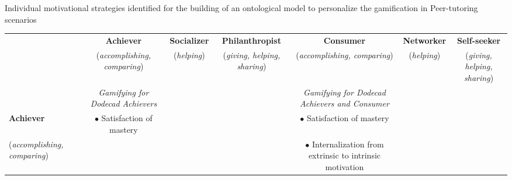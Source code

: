 \begin{landscape}%



\begin{quadro}[htb]
\caption{Individual motivational strategies identified for the building of an ontological model to personalize the gamification in Peer-tutoring scenarios}
\label{tab:individual-motivational-strategies-in-peer-tutoring-cl-scenarios}
\centering
\scriptsize
\begin{tabular}{|l|c|c|c|c|c|c|}
\hline%
\multicolumn{1}{|l|}{}&
\multicolumn{1}{c|}{\textbf{Achiever}}&
\multicolumn{1}{c|}{\textbf{Socializer}}&
\multicolumn{1}{c|}{\textbf{Philanthropist}}&
\multicolumn{1}{c|}{\textbf{Consumer}}&
\multicolumn{1}{c|}{\textbf{Networker}}&
\multicolumn{1}{c|}{\textbf{Self-seeker}}\tabularnewline
\multicolumn{1}{|l|}{}&
\multicolumn{1}{c|}{\tiny{(\emph{accomplishing, comparing})}}&
\multicolumn{1}{c|}{\tiny{(\emph{helping})}}&
\multicolumn{1}{c|}{\tiny{(\emph{giving, helping, sharing})}}&
\multicolumn{1}{c|}{\tiny{(\emph{accomplishing, comparing})}}&
\multicolumn{1}{c|}{\tiny{(\emph{helping})}}&
\multicolumn{1}{c|}{\tiny{(\emph{giving, helping, sharing})}}\tabularnewline
\hline
\hline
&
\multicolumn{1}{p{3cm}|}{\tiny\emph{Gamifying for Dodecad Achievers}}& & &
\multicolumn{1}{p{3cm}|}{\tiny\emph{Gamifying for Dodecad Achievers and Consumer}}& &  \tabularnewline
{\textbf{Achiever}}&
\multicolumn{1}{p{3cm}|}{\tiny{$\bullet$ Satisfaction of mastery}}& & &
\multicolumn{1}{p{3cm}|}{\tiny{$\bullet$ Satisfaction of mastery}}& & \tabularnewline
{\tiny(\emph{accomplishing, comparing})}&
\multicolumn{1}{p{3cm}|}{}& & &
\multicolumn{1}{p{3cm}|}{\tiny{$\bullet$ Internalization from extrinsic to intrinsic motivation}}& & \tabularnewline
\hline


\end{tabular}
\end{quadro}
\end{landscape}
